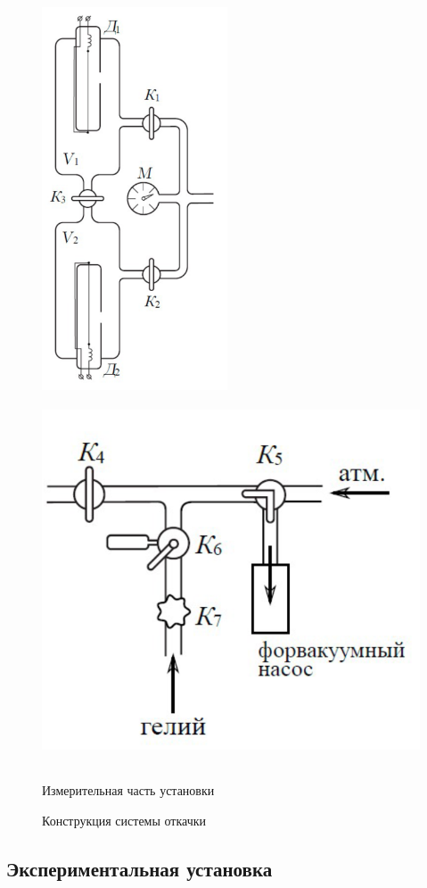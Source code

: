 \documentclass[12pt,a4paper]{article}
\begin{document}
\begin{figure}[htbp]
	\includegraphics[width=55mm]{2.2.1_2}
	\hfill
	\includegraphics[height=110mm]{2.2.1_3}\\
	\parbox{55mm}{\caption{Измерительная часть установки}\label{ris2}}
	\hfill
	\parbox{110mm}{\caption{Конструкция системы откачки}\label{ris3}}
\end{figure}

\subsection{Экспериментальная установка}
\end{document}
